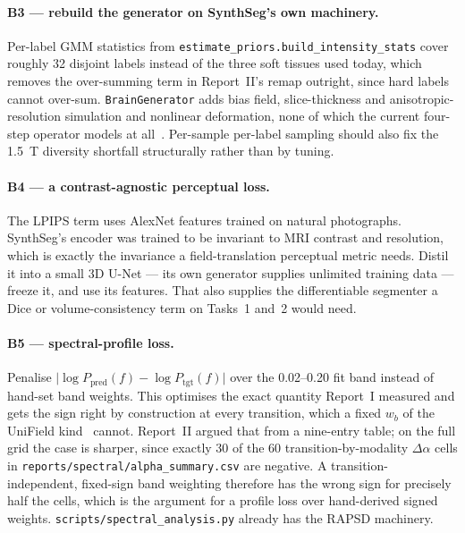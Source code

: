 \documentclass[11pt,a4paper]{article}
\newcommand{\reportone}{Report~I}
\newcommand{\reporttwo}{Report~II}
\begin{document}
\paragraph{B3 --- rebuild the generator on SynthSeg's own machinery.} Per-label GMM statistics from
\texttt{estimate\_priors.build\_intensity\_stats} cover roughly \num{32} disjoint labels instead of the
three soft tissues used today, which removes the over-summing term in \reporttwo{}'s remap outright,
since hard labels cannot over-sum. \texttt{BrainGenerator} adds bias field, slice-thickness and
anisotropic-resolution simulation and nonlinear deformation, none of which the current four-step operator
models at all~\cite{billot2023synthseg}. Per-sample per-label sampling should also fix the
\SI{1.5}{\tesla} diversity shortfall structurally rather than by tuning.

\paragraph{B4 --- a contrast-agnostic perceptual loss.} The LPIPS term uses AlexNet features trained on
natural photographs. SynthSeg's encoder was trained to be invariant to MRI contrast and resolution, which
is exactly the invariance a field-translation perceptual metric needs. Distil it into a small 3D U-Net
--- its own generator supplies unlimited training data --- freeze it, and use its features. That also
supplies the differentiable segmenter a Dice or volume-consistency term on Tasks~1 and~2 would need.

\paragraph{B5 --- spectral-profile loss.} Penalise
$\lvert \log P_{\mathrm{pred}}(f) - \log P_{\mathrm{tgt}}(f)\rvert$ over the \numrange{0.02}{0.20} fit
band instead of hand-set band weights. This optimises the exact quantity \reportone{} measured and gets
the sign right by construction at every transition, which a fixed $w_b$ of the UniField kind~\cite{lin2026unifield} cannot. \reporttwo{} argued that
from a nine-entry table; on the full grid the case is sharper, since exactly \num{30} of the
\num{60} transition-by-modality $\Delta\alpha$ cells in \texttt{reports/spectral/alpha\_summary.csv} are
negative. A transition-independent, fixed-sign band weighting therefore has the wrong sign for precisely
half the cells, which is the argument for a profile loss over hand-derived signed weights.
\texttt{scripts/spectral\_analysis.py} already has the RAPSD machinery.
\end{document}
